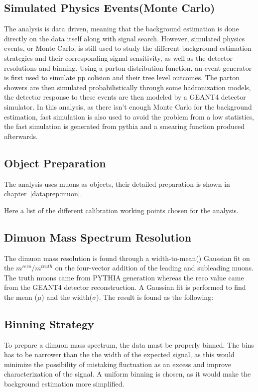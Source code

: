 \subsection{Simulated Physics Events(Monte Carlo)}
The analysis is data driven, meaning that the background estimation is done directly on the data itself along with signal search. However, simulated physics events, or Monte Carlo, is still used to study the different background estimation strategies and their corresponding signal sensitivity, as well as the detector resolutions and binning. 
Using a parton-distribution function, an event generator is first used to simulate pp colision and their tree level outcomes. The parton showers are then simulated probabilistically through some hadronization models, the detector response to these events are then modeled by a GEANT4 detector simulator. 
In this analysis, as there isn't enough Monte Carlo for the background estimation, fast simulation is also used to avoid the problem from a low statistics, the fast simulation is generated from pythia and a smearing function produced afterwards. 



\subsection{Object Preparation}
The analysis uses muons as objects, their detailed preparation is shown in chapter~\ref{dataprep:muon}. 

Here a list of the different calibration working points chosen for the analysis.


\subsection{Dimuon Mass Spectrum Resolution}
The dimuon mass resolution is found through a width-to-mean() Gaussian fit on the $m^{reco}/m^{truth}$ on the four-vector addition of the leading and subleading muons. The truth muons came from PYTHIA generation whereas the reco value came from the GEANT4 detector reconstruction. A Gaussian fit is performed to find the mean ($\mu$) and the width($\sigma$). The result is found as the following: 

\subsection{Binning Strategy}
To prepare a dimuon mass spectrum, the data must be properly binned. The bins has to be narrower than the the width of the expected signal, as this would minimize the possibility of mistaking fluctuation as an excess and improve characterization of the signal. A uniform binning is chosen, as it would make the background estimation more simplified.

